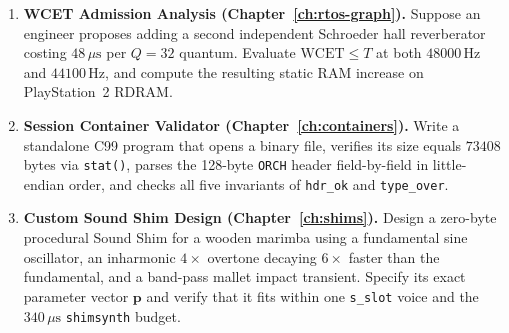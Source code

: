 \begin{enumerate}[leftmargin=1.5em]
  \item \textbf{WCET Admission Analysis (Chapter~\ref{ch:rtos-graph}).}
  Suppose an engineer proposes adding a second independent Schroeder hall reverberator costing $48\,\mu\text{s}$ per $Q = 32$ quantum. Evaluate $\mathrm{WCET} \le T$ at both $48000\,\text{Hz}$ and $44100\,\text{Hz}$, and compute the resulting static RAM increase on PlayStation~2 RDRAM.

  \item \textbf{Session Container Validator (Chapter~\ref{ch:containers}).}
  Write a standalone C99 program that opens a binary file, verifies its size equals $73408$ bytes via \texttt{stat()}, parses the 128-byte \texttt{ORCH} header field-by-field in little-endian order, and checks all five invariants of \texttt{hdr\_ok} and \texttt{type\_over}.

  \item \textbf{Custom Sound Shim Design (Chapter~\ref{ch:shims}).}
  Design a zero-byte procedural Sound Shim for a wooden marimba using a fundamental sine oscillator, an inharmonic $4\times$ overtone decaying $6\times$ faster than the fundamental, and a band-pass mallet impact transient. Specify its exact parameter vector $\mathbf{p}$ and verify that it fits within one \texttt{s\_slot} voice and the $340\,\mu\text{s}$ \texttt{shimsynth} budget.
\end{enumerate}
